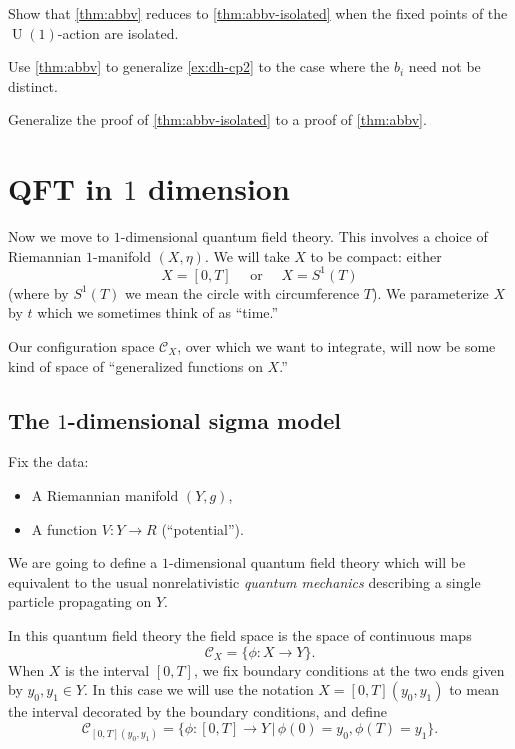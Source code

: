 \documentclass[12pt,letterpaper,reqno]{article}
\numberwithin{equation}{section}
\newcommand{\cC}{\ensuremath{\mathcal C}}
\newcommand{\ti}[1]{\textit{#1}}
\DeclareMathOperator{\U}{U}
\newcommand{\fixme}[1]{{\color{orange}{[#1]}}}
\begin{document}
\begin{exercise} Show that \autoref{thm:abbv} reduces to
\autoref{thm:abbv-isolated} when the fixed points of the
$\U(1)$-action are isolated.
\end{exercise}

\begin{exercise} Use \autoref{thm:abbv} to generalize
\autoref{ex:dh-cp2} to the case
where the $b_i$ need not be distinct.
\end{exercise}

\begin{exercise} Generalize the proof
of \autoref{thm:abbv-isolated} to a proof of \autoref{thm:abbv}. \fixme{hard? at least needs more delicacy with the steepest descent expansion}
\end{exercise}


\section{QFT in \texorpdfstring{$1$}{1} dimension}

Now we move to $1$-dimensional quantum field theory.
This involves a choice of Riemannian $1$-manifold $(X,\eta)$.
We will take $X$ to be compact: either
\begin{equation}
  X = [0,T] \quad \text{ or } \quad X = S^1(T)
\end{equation}
(where by $S^1(T)$ we mean the circle with circumference $T$).
We parameterize $X$ by $t$ which we sometimes
think of as ``time.''

Our configuration space $\cC_X$, over which we want to integrate,
will now be some kind of space
of ``generalized functions on $X$.''


\subsection{The \texorpdfstring{$1$}{1}-dimensional sigma model}

Fix the data:
\begin{itemize}
  \item A Riemannian manifold $(Y,g)$,
  \item A function $V: Y \to R$ (``potential'').
\end{itemize}
We are going to define a $1$-dimensional quantum field theory 
which will be equivalent to
the usual nonrelativistic \ti{quantum mechanics}
describing a single particle propagating on $Y$.

In this quantum field theory the
field space is the space of continuous maps
\begin{equation}
  \cC_X = \{ \phi: X \to Y\}.
\end{equation}
When $X$ is the interval $[0,T]$, we fix boundary conditions at the
two ends given by $y_0, y_1 \in Y$. 
In this case we will use the notation $X = [0,T](y_0,y_1)$ to mean the
interval decorated by the boundary conditions, and
define 
\begin{equation}
  \cC_{[0,T](y_0, y_1)} = \{\phi: [0,T] \to Y \, \vert \, \phi(0) = y_0, \phi(T) = y_1\}.
\end{equation}
\end{document}
